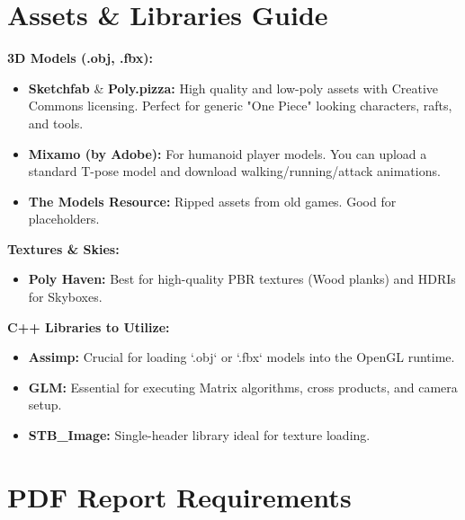 \documentclass[12pt,a4paper]{article}
\begin{document}
\section{Assets \& Libraries Guide}

\begin{tcolorbox}[
  enhanced, colback=CodeBg!90!white, colframe=NavyBlue,
  fontupper=\small\color{white}, sharp corners, left=8pt, right=8pt]
\textbf{3D Models (.obj, .fbx):}
\begin{itemize}
    \item \textbf{Sketchfab} \& \textbf{Poly.pizza:} High quality and low-poly assets with Creative Commons licensing. Perfect for generic "One Piece" looking characters, rafts, and tools.
    \item \textbf{Mixamo (by Adobe):} For humanoid player models. You can upload a standard T-pose model and download walking/running/attack animations.
    \item \textbf{The Models Resource:} Ripped assets from old games. Good for placeholders.
\end{itemize}

\textbf{Textures \& Skies:}
\begin{itemize}
    \item \textbf{Poly Haven:} Best for high-quality PBR textures (Wood planks) and HDRIs for Skyboxes.
\end{itemize}

\textbf{C++ Libraries to Utilize:}
\begin{itemize}
    \item \textbf{Assimp:} Crucial for loading `.obj` or `.fbx` models into the OpenGL runtime.
    \item \textbf{GLM:} Essential for executing Matrix algorithms, cross products, and camera setup.
    \item \textbf{STB\_Image:} Single-header library ideal for texture loading.
\end{itemize}
\end{tcolorbox}

\section{PDF Report Requirements}
\end{document}
